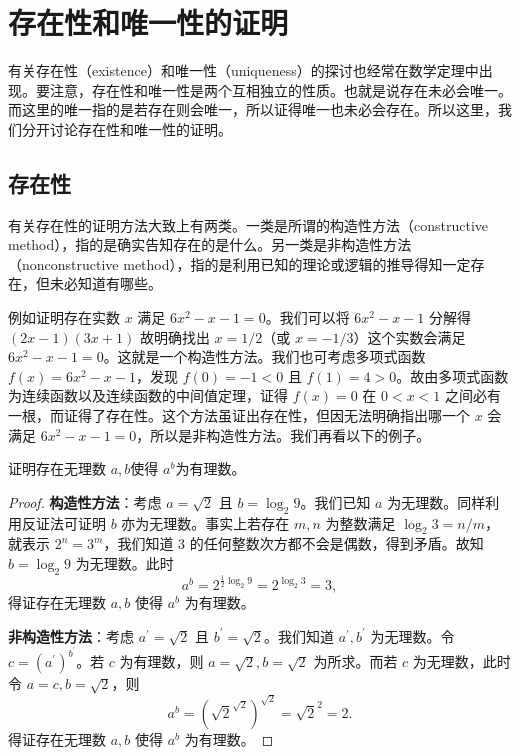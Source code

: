 \section{存在性和唯一性的证明}

有关存在性（existence）和唯一性（uniqueness）的探讨也经常在数学定理中出现。要注意，存在性和唯一性是两个互相独立的性质。也就是说存在未必会唯一。而这里的唯一指的是若存在则会唯一，所以证得唯一也未必会存在。所以这里，我们分开讨论存在性和唯一性的证明。

\subsection{存在性}

有关存在性的证明方法大致上有两类。一类是所谓的构造性方法（constructive method），指的是确实告知存在的是什么。另一类是非构造性方法（nonconstructive method），指的是利用已知的理论或逻辑的推导得知一定存在，但未必知道有哪些。

例如证明存在实数 $x$ 满足 $6x^{2} - x - 1 = 0$。我们可以将 $6x^{2} - x - 1$ 分解得 $(2x - 1)(3x + 1)$ 故明确找出 $x = 1 / 2$（或 $x = - 1 / 3$）这个实数会满足 $6x^{2} - x - 1 = 0$。这就是一个构造性方法。我们也可考虑多项式函数 $f(x) = 6x^{2} - x - 1$，发现 $f(0) = - 1 < 0$ 且 $f(1) = 4 > 0$。故由多项式函数为连续函数以及连续函数的中间值定理，证得 $f(x) = 0$ 在 $0 < x < 1$ 之间必有一根，而证得了存在性。这个方法虽证出存在性，但因无法明确指出哪一个 $x$ 会满足 $6x^{2} - x - 1 = 0$，所以是非构造性方法。我们再看以下的例子。

\begin{example}
证明存在无理数 $a, b$使得 $a^{b}$为有理数。
\end{example}

\begin{proof}
\textbf{构造性方法}：考虑 $a = \sqrt{2}$ 且 $b = \log_{2}9$。我们已知 $a$ 为无理数。同样利用反证法可证明 $b$ 亦为无理数。事实上若存在 $m, n$ 为整数满足 $\log_{2}3 = n / m$，就表示 $2^{n} = 3^{m}$，我们知道 $3$ 的任何整数次方都不会是偶数，得到矛盾。故知 $b = \log_{2}9$ 为无理数。此时
$$a^{b} = 2^{\frac{1}{2}\log_{2}9} = 2^{\log_{2}3} = 3,$$
得证存在无理数 $a, b$ 使得 $a^{b}$ 为有理数。

\textbf{非构造性方法}：考虑 $a^{\prime} = \sqrt{2}$ 且 $b^{\prime} = \sqrt{2}$。我们知道 $a^{\prime}, b^{\prime}$ 为无理数。令 $c = (a^{\prime})^{b^{\prime}}$。若 $c$ 为有理数，则 $a = \sqrt{2}, b = \sqrt{2}$ 为所求。而若 $c$ 为无理数，此时令 $a = c, b = \sqrt{2}$，则
$$a^{b} = (\sqrt{2}^{\sqrt{2}})^{\sqrt{2}} = \sqrt{2}^{2} = 2.$$
得证存在无理数 $a, b$ 使得 $a^{b}$ 为有理数。
\end{proof}

